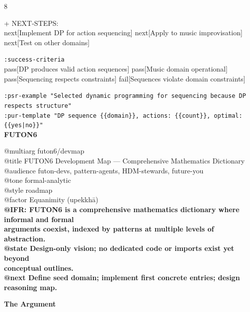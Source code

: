 \documentclass[landscape]{article}
\newenvironment{devmapgreenfield}{%
  \def\FrameCommand{\colorbox{devmapgreenfieldbg}}%
  \setlength{\fboxsep}{2pt}%
  \MakeFramed{\advance\hsize-\width \FrameRestore}%
}{\endMakeFramed}
\begin{document}
\begin{paracol}{8}
\begin{devmapgreenfield}
\par
  + NEXT-STEPS:\\
    next[Implement DP for action sequencing] next[Apply to music improvisation] next[Test on other domains]\\
\par
  \texttt{:\allowbreak{}success-\allowbreak{}criteria}\\
    pass[DP produces valid action sequences] pass[Music domain operational] pass[Sequencing respects constraints] fail[Sequences violate domain constraints]\\
\par
  \texttt{:\allowbreak{}psr-\allowbreak{}example "Selected dynamic programming for sequencing because DP respects structure"}\\
  \texttt{:\allowbreak{}pur-\allowbreak{}template "DP sequence \{\{domain\}\},\allowbreak{} actions:\allowbreak{} \{\{count\}\},\allowbreak{} optimal:\allowbreak{} \{\{yes|\allowbreak{}no\}\}"}\\
\end{devmapgreenfield}
\switchcolumn
\textbf{FUTON6}\par
\medskip
@multiarg futon6/devmap\\
@title FUTON6 Development Map — Comprehensive Mathematics Dictionary\\
@audience futon-devs, pattern-agents, HDM-stewards, future-you\\
@tone formal-analytic\\
@style roadmap\\
@factor Equanimity (upekkhā)\\
\textbf{@IFR: FUTON6 is a comprehensive mathematics dictionary where informal and formal}\\
\textbf{arguments coexist, indexed by patterns at multiple levels of abstraction.}\\
\textbf{@state Design-only vision; no dedicated code or imports exist yet beyond}\\
\textbf{conceptual outlines.}\\
\textbf{@next Define seed domain; implement first concrete entries; design reasoning map.}\\
\par
\textbf{The Argument}\par
\par

\end{paracol}
\end{document}
